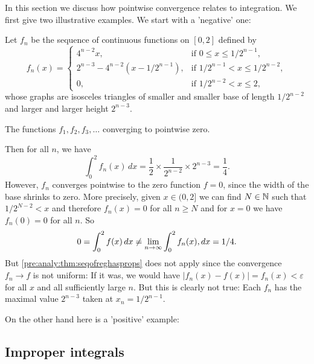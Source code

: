 \documentclass[10pt, a4paper]{article}
\begin{document}
In this section we discuss how pointwise convergence relates to integration.
We first give two illustrative examples.
We start with a 'negative' one:
\begin{example}
    Let $f_n$ be the sequence of continuous functions on $[0, 2]$ defined by
    \[
    f_n(x) = \begin{cases}
        4 ^ {n - 2}x, &\text{if } 0 \leq x \leq 1 / 2 ^ {n - 1}, \\
        2 ^ {n - 3} - 4 ^ {n - 2}(x - 1 / 2 ^ {n - 1}), &\text{if } 1 / 2 ^ {n - 1} < x \leq 1 / 2 ^ {n - 2}, \\
        0, &\text{if } 1 / 2 ^ {n - 2} < x \leq 2,
    \end{cases}
    \]
    whose graphs are isosceles triangles of smaller and smaller base of length $1 / 2 ^ {n - 2}$ and larger and larger height $2 ^ {n - 3}$.

    The functions $f_1, f_2, f_3, \dotsc$ converging to pointwise zero.

    Then for all $n$,
    we have
    \[
    \int_{0}^{2}f_n(x)\,dx = \frac{1}{2} \times \frac{1}{2 ^ {n - 2}} \times 2 ^ {n - 3} = \frac{1}{4}.
    \]
    However,
    $f_n$ converges pointwise to the zero function $f = 0$,
    since the width of the base shrinks to zero.
    More precisely,
    given $x \in (0, 2]$ we can find $N \in \mathbb{N}$ such that $1 / 2 ^ {N - 2} < x$ and therefore $f_n(x) = 0$ for all $n \geq N$ and for $x = 0$ we have $f_n(0) = 0$ for all $n$.
    So
    \[
    0 = \int_{0}^{2}f(x)\,dx \neq \lim_{n \rightarrow \infty}\int_{0}^{2}f_n(x),dx = 1 / 4.
    \]
    But \autoref{pre:analy:thm:seqofreghasprops} does not apply since the convergence $f_n \rightarrow f$ is not uniform:
    If it was,
    we would have $|f_n(x) - f(x)| = f_n(x) < \varepsilon$ for all $x$ and all sufficiently large $n$.
    But this is clearly not true:
    Each $f_n$ has the maximal value $2 ^ {n - 3}$ taken at $x_n = 1 / 2 ^ {n - 1}$.
\end{example}

On the other hand here is a 'positive' example:























































\subsection{Improper integrals}
\end{document}
